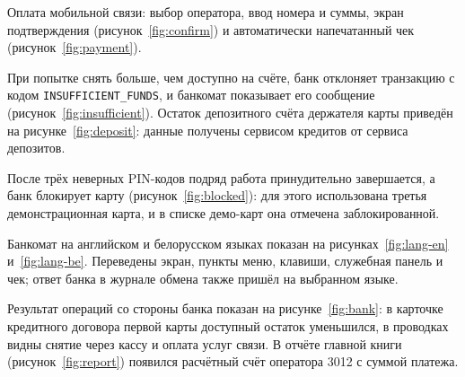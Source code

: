 \documentclass[14pt,a4paper]{extarticle}
\begin{document}

Оплата мобильной связи: выбор оператора, ввод номера и суммы, экран подтверждения
(рисунок~\ref{fig:confirm}) и автоматически напечатанный чек (рисунок~\ref{fig:payment}).



При попытке снять больше, чем доступно на счёте, банк отклоняет транзакцию с кодом
\texttt{INSUFFICIENT\_FUNDS}, и банкомат показывает его сообщение
(рисунок~\ref{fig:insufficient}). Остаток депозитного счёта держателя карты приведён на
рисунке~\ref{fig:deposit}: данные получены сервисом кредитов от сервиса депозитов.



После трёх неверных PIN-кодов подряд работа принудительно завершается, а банк блокирует
карту (рисунок~\ref{fig:blocked}): для этого использована третья демонстрационная карта, и
в списке демо-карт она отмечена заблокированной.


Банкомат на английском и белорусском языках показан на рисунках~\ref{fig:lang-en}
и~\ref{fig:lang-be}. Переведены экран, пункты меню, клавиши, служебная панель и чек; ответ
банка в журнале обмена также пришёл на выбранном языке.



Результат операций со стороны банка показан на рисунке~\ref{fig:bank}: в карточке
кредитного договора первой карты доступный остаток уменьшился, в проводках видны снятие
через кассу и оплата услуг связи. В отчёте главной книги (рисунок~\ref{fig:report}) появился
расчётный счёт оператора 3012 с суммой платежа.

\end{document}
